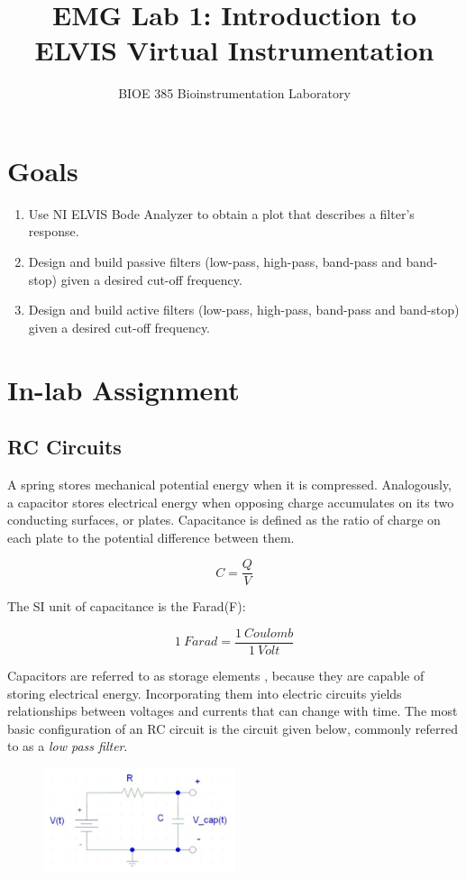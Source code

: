 \documentclass{article}
\title{EMG Lab 1: Introduction to ELVIS Virtual Instrumentation}
\author{BIOE 385 Bioinstrumentation Laboratory}
\date{}
\begin{document}
\large
\maketitle

\section*{Goals}
\begin{enumerate}
	\item Use NI ELVIS Bode Analyzer to obtain a plot that describes a filter’s response.
	\item Design and build passive filters (low-pass, high-pass, band-pass and band-stop) given a desired cut-off frequency.
	\item Design and build active filters (low-pass, high-pass, band-pass and band-stop) given a desired cut-off frequency.
\end{enumerate}

\section*{In-lab Assignment}
\subsection*{RC Circuits}

A spring stores mechanical potential energy when it is compressed. Analogously, a capacitor stores electrical energy when opposing charge accumulates on its two conducting surfaces, or plates. Capacitance is defined as the ratio of charge on each plate to the potential difference between them.

$$C = \frac{Q}{V}$$

The SI unit of capacitance is the Farad(F):

$$1\ Farad = \frac{1\ Coulomb}{1\ Volt}$$

Capacitors are referred to as storage elements , because they are capable of storing electrical energy. Incorporating them into electric circuits yields relationships between voltages and currents that can change with time. The most basic configuration of an RC circuit is the circuit given below, commonly referred to as a \textit{low pass filter}.

\begin{figure}[h]
    	\includegraphics[width=0.5\textwidth]{lab_1_fig_1.jpg}
    	\centering
		\end{figure}
\end{document}
